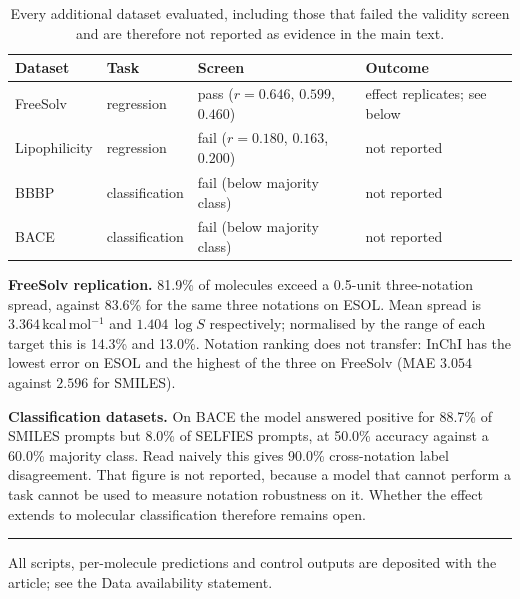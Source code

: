 \documentclass[11pt,a4paper]{article}
\newcommand{\logS}{\ensuremath{\log S}}
\begin{document}
\begin{table}[h]
\centering
\caption{Every additional dataset evaluated, including those that failed the validity screen and are
therefore not reported as evidence in the main text.}
\label{tab:datasets}
\small
\begin{tabular}{llll}
\toprule
Dataset & Task & Screen & Outcome \\
\midrule
FreeSolv      & regression     & pass ($r = 0.646$, $0.599$, $0.460$) & effect replicates; see below \\
Lipophilicity & regression     & fail ($r = 0.180$, $0.163$, $0.200$) & not reported \\
BBBP          & classification & fail (below majority class)          & not reported \\
BACE          & classification & fail (below majority class)          & not reported \\
\bottomrule
\end{tabular}
\end{table}

\noindent \textbf{FreeSolv replication.} 81.9\% of molecules exceed a 0.5-unit three-notation spread,
against 83.6\% for the same three notations on ESOL. Mean spread is $3.364$\,kcal\,mol$^{-1}$ and
$1.404\,\logS$ respectively; normalised by the range of each target this is 14.3\% and 13.0\%.
Notation ranking does not transfer: InChI has the lowest error on ESOL and the highest of the three
on FreeSolv (MAE $3.054$ against $2.596$ for SMILES).

\noindent \textbf{Classification datasets.} On BACE the model answered positive for 88.7\% of SMILES
prompts but 8.0\% of SELFIES prompts, at 50.0\% accuracy against a 60.0\% majority class. Read
naively this gives 90.0\% cross-notation label disagreement. That figure is not reported, because a
model that cannot perform a task cannot be used to measure notation robustness on it. Whether the
effect extends to molecular classification therefore remains open.

\vspace{0.6cm}
\noindent\rule{\textwidth}{0.5pt}

\noindent\small All scripts, per-molecule predictions and control outputs are deposited with the
article; see the Data availability statement.
\end{document}
